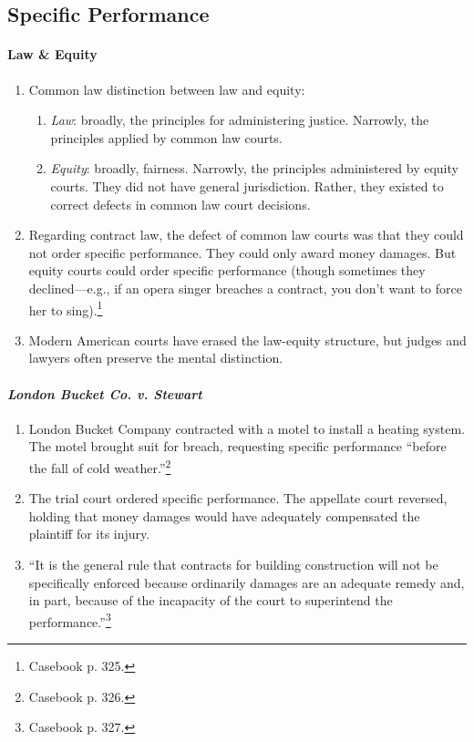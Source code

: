 \subsection{Specific Performance}

\paragraph{Law \& Equity}

\begin{enumerate}
    \item Common law distinction between law and equity:
    \begin{enumerate}
        \item \emph{Law}: broadly, the principles for administering justice. 
        Narrowly, the principles applied by common law courts.
        \item \emph{Equity}: broadly, fairness. Narrowly, the principles 
        administered by equity courts. They did not have general jurisdiction. 
        Rather, they existed to correct defects in common law court decisions.
    \end{enumerate}
    \item Regarding contract law, the defect of common law courts was that  
    they could not order specific performance. They could only award money 
    damages. But equity courts could order specific performance (though 
    sometimes they declined---e.g., if an opera singer breaches a contract, 
    you don't want to force her to sing).\footnote{Casebook p. 325.}
    \item Modern American courts have erased the law-equity structure, but 
    judges and lawyers often preserve the mental distinction.
\end{enumerate}

\paragraph{\emph{London Bucket Co. v. Stewart}}

\begin{enumerate}
    \item London Bucket Company contracted with a motel to install a heating 
    system. The motel brought suit for breach, requesting specific performance 
    ``before the fall of cold weather.''\footnote{Casebook p. 326.}
    \item The trial court ordered specific performance. The appellate court 
    reversed, holding that money damages would have adequately compensated the 
    plaintiff for its injury.
    \item ``It is the general rule that contracts for building construction 
    will not be specifically enforced because ordinarily damages are an 
    adequate remedy and, in part, because of the incapacity of the court to 
    superintend the performance.''\footnote{Casebook p. 327.}
\end{enumerate}

